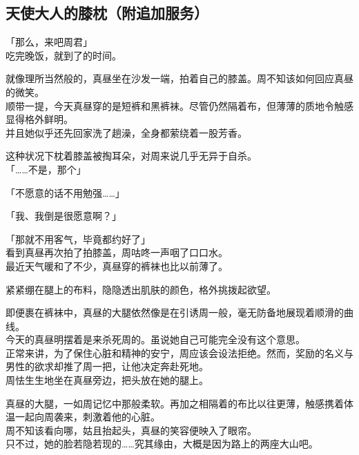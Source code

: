 \subsection{天使大人的膝枕（附追加服务）}

「那么，来吧周君」\\

吃完晚饭，就到了的时间。

就像理所当然般的，真昼坐在沙发一端，拍着自己的膝盖。周不知该如何回应真昼的微笑。\\

顺带一提，今天真昼穿的是短裤和黑裤袜。尽管仍然隔着布，但薄薄的质地令触感显得格外鲜明。\\

并且她似乎还先回家洗了趟澡，全身都萦绕着一股芳香。

这种状况下枕着膝盖被掏耳朵，对周来说几乎无异于自杀。\\

「……不是，那个」

「不愿意的话不用勉强……」

「我、我倒是很愿意啊？」

「那就不用客气，毕竟都约好了」\\

看到真昼再次拍了拍膝盖，周咕咚一声咽了口口水。\\

最近天气暖和了不少，真昼穿的裤袜也比以前薄了。

紧紧绷在腿上的布料，隐隐透出肌肤的颜色，格外挑拨起欲望。

即便裹在裤袜中，真昼的大腿依然像是在引诱周一般，毫无防备地展现着顺滑的曲线。\\

今天的真昼明摆着是来杀死周的。虽说她自己可能完全没有这个意思。\\

正常来讲，为了保住心脏和精神的安宁，周应该会设法拒绝。然而，奖励的名义与男性的欲求却推了周一把，让他决定奔赴死地。\\

周怯生生地坐在真昼旁边，把头放在她的腿上。

真昼的大腿，一如周记忆中那般柔软。再加之相隔着的布比以往更薄，触感携着体温一起向周袭来，刺激着他的心脏。\\

周不知该看向哪，姑且抬起头，真昼的笑容便映入了眼帘。\\

只不过，她的脸若隐若现的……究其缘由，大概是因为路上的两座大山吧。\\

